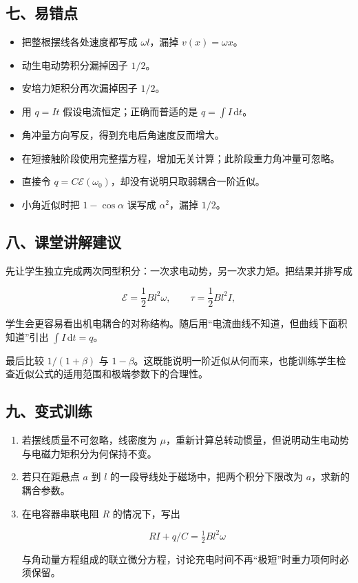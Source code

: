 \documentclass[12pt,a4paper,UTF8]{ctexart}
\newcommand{\tightlist}{\setlength{\itemsep}{0pt}\setlength{\parskip}{0pt}}
\begin{document}
\subsection{七、易错点}\label{ux4e03ux6613ux9519ux70b9-2}

\begin{itemize}
\tightlist
\item
  把整根摆线各处速度都写成 \(\omega l\)，漏掉 \(v(x)=\omega x\)。
\item
  动生电动势积分漏掉因子 \(1/2\)。
\item
  安培力矩积分再次漏掉因子 \(1/2\)。
\item
  用 \(q=It\) 假设电流恒定；正确而普适的是 \(q=\int I\,\mathrm{d}t\)。
\item
  角冲量方向写反，得到充电后角速度反而增大。
\item
  在短接触阶段使用完整摆方程，增加无关计算；此阶段重力角冲量可忽略。
\item
  直接令 \(q=C\mathcal E(\omega_0)\)，却没有说明只取弱耦合一阶近似。
\item
  小角近似时把 \(1-\cos\alpha\) 误写成 \(\alpha^2\)，漏掉 \(1/2\)。
\end{itemize}

\subsection{八、课堂讲解建议}\label{ux516bux8bfeux5802ux8bb2ux89e3ux5efaux8bae-2}

先让学生独立完成两次同型积分：一次求电动势，另一次求力矩。把结果并排写成

\[
\mathcal E=\frac12Bl^2\omega,
\qquad
\tau=\frac12Bl^2I,
\]

学生会更容易看出机电耦合的对称结构。随后用``电流曲线不知道，但曲线下面积知道''引出
\(\int I\,\mathrm{d}t=q\)。

最后比较 \(1/(1+\beta)\) 与
\(1-\beta\)。这既能说明一阶近似从何而来，也能训练学生检查近似公式的适用范围和极端参数下的合理性。

\subsection{九、变式训练}\label{ux4e5dux53d8ux5f0fux8badux7ec3-2}

\begin{enumerate}
\def\labelenumi{\arabic{enumi}.}
\item
  若摆线质量不可忽略，线密度为
  \(\mu\)，重新计算总转动惯量，但说明动生电动势与电磁力矩积分为何保持不变。
\item
  若只在距悬点 \(a\) 到 \(l\) 的一段导线处于磁场中，把两个积分下限改为
  \(a\)，求新的耦合参数。
\item
  在电容器串联电阻 \(R\) 的情况下，写出

  \[RI+q/C=\tfrac12Bl^2\omega\]

  与角动量方程组成的联立微分方程，讨论充电时间不再``极短''时重力项何时必须保留。
\end{enumerate}
\end{document}
